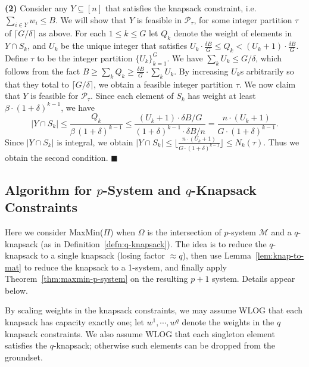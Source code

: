 \documentclass[11pt,letterpaper]{article}
\newenvironment{proof}{

\noindent{\bf Proof:}} {\hfill$\blacksquare$


}
\def\p {\ensuremath{\mathcal{P}}\xspace}
\def\ms{\ensuremath{\mathcal{M}}\xspace}
\def\cov{\ensuremath{\Pi}\xspace}
\def\mmp{{\sf MaxMin(\cov)}\xspace}
\newcommand{\sse}{\subseteq}
\newcounter{note}[section]
\begin{document}
\begin{proof}
{\bf (2)} Consider  any $Y\sse[n]$ that satisfies the knapsack constraint, i.e. $\sum_{i\in Y} w_i\le B$. We will show
that $Y$ is feasible in $\p_\tau$, for some integer partition $\tau$ of $\lceil G/\delta\rceil$ as above. For each
$1\le k\le G$ let $Q_k$ denote the weight of elements in $Y\cap S_k$, and $U_k$ be the unique integer that satisfies
$U_k \cdot \frac{\delta B}G\le Q_k< (U_k+1) \cdot \frac{\delta B}G$. Define $\tau$ to be the integer partition
$\{U_k\}_{k=1}^G$. We have $\sum_k U_k\le G/\delta$, which follows from the fact $B\ge \sum_k Q_k \ge \frac{\delta B}G
\cdot \sum_k U_k$. By increasing $U_k$s arbitrarily so that they total to $\lceil G/\delta\rceil$, we obtain  a
feasible integer partition $\tau$.
We now claim that $Y$ is feasible for $\p_\tau$. Since each element of $S_k$ has weight at least $\beta\cdot
(1+\delta)^{k-1}$, we have
$$|Y\cap S_k|\le \frac{Q_k}{\beta\,(1+\delta)^{k-1}}\le \frac{(U_k+1)\cdot \delta B/G}{(1+\delta)^{k-1}\cdot \delta
B/n} = \frac{n\cdot (U_k+1)}{G\cdot (1+\delta)^{k-1}}.$$ Since $|Y\cap S_k|$ is integral, we obtain $|Y\cap S_k|\le
\lfloor \frac{n\cdot (U_k+1)}{G\cdot (1+\delta)^{k-1}} \rfloor\le N_k(\tau)$. Thus we obtain the second condition.
\end{proof}

\subsection{Algorithm for $p$-System and $q$-Knapsack Constraints}\label{subsec:mm-knap-psystem}
Here we consider \mmp when $\Omega$ is the intersection of $p$-system \ms and a $q$-knapsack (as in
Definition~\ref{defn:q-knapsack}). The idea is to reduce the $q$-knapsack to a single knapsack (losing factor $\approx
q$), then use Lemma~\ref{lem:knap-to-mat} to reduce the knapsack to a 1-system, and finally apply
Theorem~\ref{thm:maxmin-p-system} on the resulting $p+1$ system. Details appear below.

By scaling weights in the knapsack constraints, we may assume WLOG that each knapsack has capacity exactly one; let
$w^1,\cdots,w^q$ denote the weights in the $q$ knapsack constraints. We also assume WLOG that each singleton element
satisfies the $q$-knapsack; otherwise such elements can be dropped from the groundset.
\end{document}
